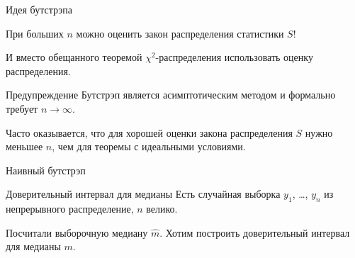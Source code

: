 \begin{frame}{Идея бутстрэпа}

  При больших $n$ можно оценить закон распределения статистики $S$!

  \pause

  И вместо обещанного теоремой $\chi^2$-распределения использовать оценку распределения.

  \pause

  \begin{block}{Предупреждение}
  Бутстрэп является асимптотическим методом и формально требует $n \to \infty$. 
  \end{block}

  \pause 

  Часто оказывается, что для хорошей оценки закона распределения $S$ нужно меньшее $n$, чем для теоремы с идеальными условиями.
\end{frame}


\begin{frame}{Наивный бутстрэп}

\begin{block}{Доверительный интервал для медианы}
Есть случайная выборка $y_1$, \ldots, $y_n$ из непрерывного распределение, $n$ велико. 

Посчитали выборочную медиану $\hat m$. Хотим построить доверительный интервал для медианы $m$. 
\end{block}



\end{frame}


